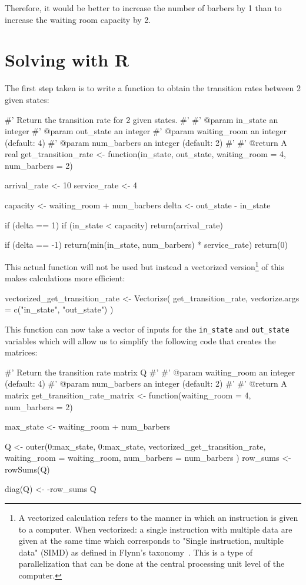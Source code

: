 Therefore, it would be better to increase the number of barbers by 1
than to increase the waiting room capacity by 2.

\section{Solving with R}\label{sec:solving-with-R}

The first step taken is to write a function to obtain the transition rates
between 2 given states:

\begin{Rin}
#' Return the transition rate for 2 given states.
#'
#' @param in_state an integer
#' @param out_state an integer
#' @param waiting_room an integer (default: 4)
#' @param num_barbers an integer  (default: 2)
#'
#' @return A real
get_transition_rate <- function(in_state,
                                out_state,
                                waiting_room = 4,
                                num_barbers = 2){
  arrival_rate <- 10
  service_rate <- 4

  capacity <- waiting_room + num_barbers
  delta <- out_state - in_state

  if (delta == 1) {
    if (in_state < capacity) {
      return(arrival_rate)
    }
  }

  if (delta == -1) {
    return(min(in_state, num_barbers) * service_rate)
  }
  return(0)
}
\end{Rin}

This actual function will not be used but instead a vectorized
version\footnote{
A vectorized calculation refers to the manner in which an instruction is given
to a computer. When vectorized: a single instruction with multiple
data are given at the same time
which corresponds to "Single instruction, multiple data" (SIMD) as defined in
Flynn's taxonomy~\autocite{flynn1966very}. This is a type of parallelization
that can be done at the central processing unit level of the computer. }
of this
makes calculations more efficient:

\begin{Rin}
vectorized_get_transition_rate <- Vectorize(
  get_transition_rate,
  vectorize.args = c("in_state", "out_state")
)
\end{Rin}

This function can now take a vector of inputs for the \texttt{in_state}
and \texttt{out_state} variables which will allow us to simplify the
following code that creates the matrices:

\begin{Rin}
#' Return the transition rate matrix Q
#'
#' @param waiting_room an integer (default: 4)
#' @param num_barbers an integer (default: 2)
#'
#' @return A matrix
get_transition_rate_matrix <- function(waiting_room = 4,
                                       num_barbers = 2){
  max_state <- waiting_room + num_barbers

  Q <- outer(0:max_state,
    0:max_state,
    vectorized_get_transition_rate,
    waiting_room = waiting_room,
    num_barbers = num_barbers
  )
  row_sums <- rowSums(Q)

  diag(Q) <- -row_sums
  Q
}
\end{Rin}

